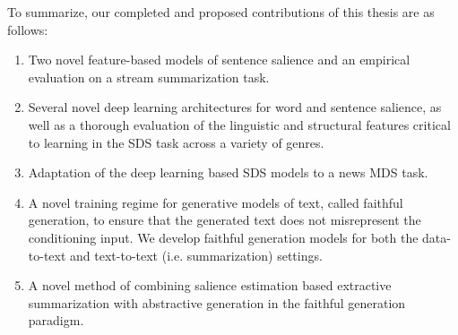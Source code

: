 To summarize, our completed and proposed contributions of this thesis are as 
follows:
\begin{enumerate}

 \item Two novel feature-based models of sentence salience and an empirical
    evaluation on a stream summarization task.


 \item Several novel deep learning architectures for word and sentence 
   salience, as well as a thorough evaluation of the linguistic and
   structural features critical to learning in the SDS task across a 
   variety of genres.

 \item Adaptation of the deep learning based SDS models to a news MDS task. 

 \item A novel training regime for generative models of text, 
     called faithful generation, to ensure that the generated text does
     not misrepresent the conditioning input. We develop faithful generation
     models for both the data-to-text and text-to-text (i.e. summarization)
     settings.

 \item A novel method of combining salience estimation based extractive 
     summarization with abstractive generation in the faithful generation
    paradigm.    




\end{enumerate}




